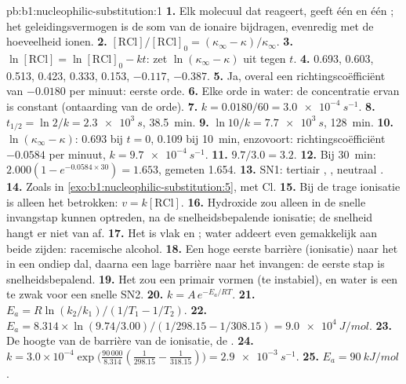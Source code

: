 \begin{solution}{pb:b1:nucleophilic-substitution:1}
\textbf{1.} Elk molecuul dat reageert, geeft één  en één ;
het geleidingsvermogen is de som van de ionaire bijdragen, evenredig met
de hoeveelheid ionen.
\textbf{2.} $[\mathrm{RCl}]/[\mathrm{RCl}]_0 = (\kappa_\infty -
\kappa)/\kappa_\infty$.
\textbf{3.} $\ln[\mathrm{RCl}] = \ln[\mathrm{RCl}]_0 - kt$: zet
$\ln(\kappa_\infty - \kappa)$ uit tegen $t$.
\textbf{4.} 0.693, 0.603, 0.513, 0.423, 0.333, 0.153, $-0.117$, $-0.387$.
\textbf{5.} Ja, overal een richtingscoëfficiënt van $-0.0180$ per minuut:
eerste orde.
\textbf{6.} Elke orde in water: de concentratie ervan is constant
(ontaarding van de orde).
\textbf{7.} $k = 0.0180/60 = \qty{3.0e-4}{s^{-1}}$.
\textbf{8.} $t_{1/2} = \ln 2/k = \qty{2.3e3}{s}$, \qty{38.5}{min}.
\textbf{9.} $\ln 10/k = \qty{7.7e3}{s}$, \qty{128}{min}.
\textbf{10.} $\ln(\kappa_\infty - \kappa)$: 0.693 bij $t = 0$, 0.109 bij
\qty{10}{min}, enzovoort: richtingscoëfficiënt $-0.0584$ per minuut,
$k = \qty{9.7e-4}{s^{-1}}$.
\textbf{11.} $9.7/3.0 = 3.2$.
\textbf{12.} Bij \qty{30}{min}: $2.000(1 - e^{-0.0584 \times 30}) = 1.653$,
gemeten 1.654.
\textbf{13.} SN1: tertiair , , neutraal
.
\textbf{14.} Zoals in \cref{exo:b1:nucleophilic-substitution:5}, met Cl.
\textbf{15.} Bij de trage ionisatie is alleen het  betrokken:
$v =
k[\mathrm{RCl}]$.
\textbf{16.} Hydroxide zou alleen in de snelle invangstap kunnen
optreden, na de snelheidsbepalende ionisatie; de snelheid hangt er niet
van af.
\textbf{17.} Het  is vlak en ; water addeert even
gemakkelijk aan beide zijden: racemische alcohol.
\textbf{18.} Een hoge eerste barrière (ionisatie) naar het  in
een ondiep dal, daarna een lage barrière naar het invangen: de eerste
stap is snelheidsbepalend.
\textbf{19.} Het zou een primair  vormen (te instabiel), en
water is een te zwak  voor een snelle SN2.
\textbf{20.} $k = A\,e^{-E_a/RT}$.
\textbf{21.} $E_a = R\ln(k_2/k_1)/(1/T_1 - 1/T_2)$.
\textbf{22.} $E_a = 8.314 \times \ln(9.74/3.00)/(1/298.15 - 1/308.15) =
\qty{9.0e4}{J/mol}$.
\textbf{23.} De hoogte van de barrière van de ionisatie, de
.
\textbf{24.} $k = 3.0 \times 10^{-4} \exp\bigl(\frac{90\,000}{8.314}
(\frac{1}{298.15} - \frac{1}{318.15})\bigr) = \qty{2.9e-3}{s^{-1}}$.
\textbf{25.} \textbf{$E_a = \qty{90}{kJ/mol}$}.
\end{solution}
